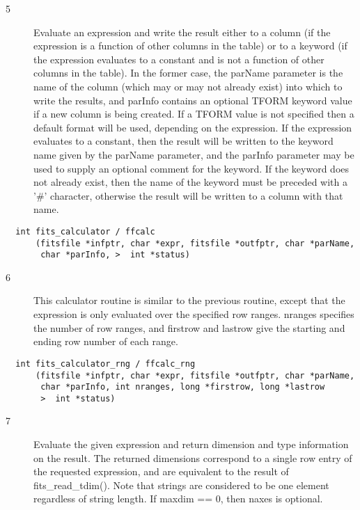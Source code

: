 \documentclass[11pt]{book}
\begin{document}
\begin{description}
\item[5 ]Evaluate an expression and write the result either to a column (if
the expression is a function of other columns in the table) or to a
keyword (if the expression evaluates to a constant and is not a
function of other columns in the table).  In the former case, the
parName parameter is the name of the column (which may or may not already
exist) into which to write the results, and parInfo contains an
optional TFORM keyword value if a new column is being created.  If a
TFORM value is not specified then a default format will be used,
depending on the expression.  If the expression evaluates to a constant,
then the result will be written to the keyword name given by the
parName parameter, and the parInfo parameter may be used to supply an
optional comment for the keyword.  If the keyword does not already
exist, then the name of the keyword must be preceded with a '\#' character,
 otherwise the result will be written to a column with that name. \label{ffcalc}
\end{description}

\begin{verbatim}
  int fits_calculator / ffcalc
      (fitsfile *infptr, char *expr, fitsfile *outfptr, char *parName,
       char *parInfo, >  int *status)
\end{verbatim}

\begin{description}
\item[6 ] This calculator routine is similar to the previous routine, except
that the expression is only evaluated over the specified
row ranges.  nranges specifies the number of row ranges, and firstrow
and lastrow give the starting and ending row number of each range. \label{ffcalcrng}
\end{description}

\begin{verbatim}
  int fits_calculator_rng / ffcalc_rng
      (fitsfile *infptr, char *expr, fitsfile *outfptr, char *parName,
       char *parInfo, int nranges, long *firstrow, long *lastrow
       >  int *status)
\end{verbatim}

\begin{description}
\item[7 ]Evaluate the given expression and return dimension and type information
on the result.  The returned dimensions correspond to a single row entry
of the requested expression, and are equivalent to the result of fits\_read\_tdim().
Note that strings are considered to be one element regardless of string length.
If maxdim == 0, then naxes is optional. \label{fftexp}
\end{description}
\end{document}
